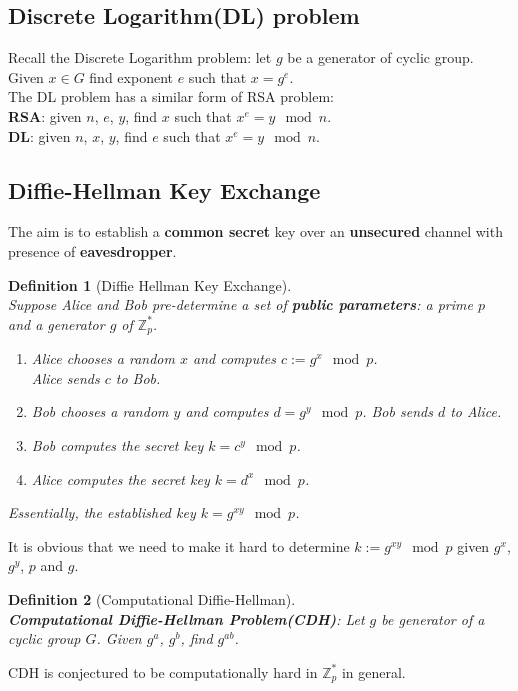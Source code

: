 \documentclass[12pt]{article}
\newtheorem{definition}{Definition}[section]
\theoremstyle{definition}
\begin{document}
\subsection{Discrete Logarithm(DL) problem}
Recall the Discrete Logarithm problem: let $g$ be a generator of cyclic group. Given $x\in G$ find exponent $e$ such that $x=g^e$.\\
The DL problem has a similar form of RSA problem:\\
\textbf{RSA}: given $n$, $e$, $y$, find $x$ such that $x^e=y\mod n$.\\
\textbf{DL}: given $n$, $x$, $y$, find $e$ such that $x^e=y\mod n$.\\
\subsection{Diffie-Hellman Key Exchange}
The aim is to establish a \textbf{common secret} key over an \textbf{unsecured} channel with presence of \textbf{eavesdropper}.\\
\begin{definition}[Diffie Hellman Key Exchange]
\hfill\\\normalfont Suppose Alice and Bob pre-determine a set of \textbf{public parameters}: a prime $p$ and a generator $g$ of $\mathbb{Z}_p^\ast$.
\begin{enumerate}
  \item Alice chooses a random $x$ and computes $c:=g^x\mod p$.\\Alice sends $c$ to Bob.
  \item Bob chooses a random $y$ and computes $d=g^y\mod p$. Bob sends $d$ to Alice.
  \item Bob computes the secret key $k=c^y\mod p$.
  \item Alice computes the secret key $k=d^x\mod p$.
\end{enumerate}
Essentially, the established key $k=g^{xy}\mod p$.
\end{definition}
It is obvious that we need to make it hard to determine $k:=g^{xy}\mod p$ given $g^x$, $g^y$, $p$ and $g$.
\begin{definition}[Computational Diffie-Hellman]
\hfill\\\normalfont \textbf{Computational Diffie-Hellman Problem(CDH)}: Let $g$ be generator of a cyclic group $G$. Given $g^a$, $g^b$, find $g^{ab}$.
\end{definition}
CDH is conjectured to be computationally hard in $\mathbb{Z}_p^\ast$ in general. \\
\end{document}
